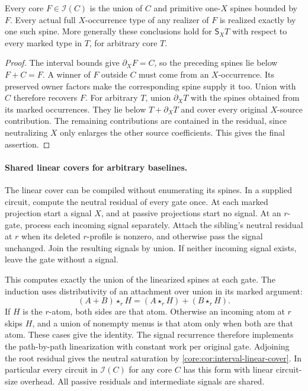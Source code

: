 \begin{corollary}
\label{core:cor:interval-linear-cover}
Every core $F\in\mathcal I(C)$ is the union of $C$ and primitive
one-$X$ spines bounded by $F$. Every actual full $X$-occurrence type
of any realizer of $F$ is realized exactly by one such spine.
More generally these conclusions hold for $\mathsf S_XT$ with respect
to every marked type in $T$, for arbitrary core $T$.
\end{corollary}
\begin{proof}
The interval bounds give $\partial_XF=C$, so the preceding spines
lie below $F+C=F$. A winner of $F$ outside $C$ must come from an
$X$-occurrence. Its preserved owner factors make the corresponding
spine supply it too. Union with $C$ therefore recovers $F$.
For arbitrary $T$, union $\partial_XT$ with the spines obtained from
its marked occurrences. They lie below $T+\partial_XT$ and cover
every original $X$-source contribution. The remaining contributions
are contained in the residual, since neutralizing $X$ only enlarges
the other source coefficients. This gives the final assertion.
\end{proof}

\paragraph{Shared linear covers for arbitrary baselines.}
The linear cover can be compiled without enumerating
its spines. In a supplied circuit, compute the neutral
residual of every gate once. At each marked projection
start a signal $X$, and at passive projections start
no signal. At an $r$-gate, process each incoming
signal separately. Attach the sibling's neutral
residual at $r$ when its deleted $r$-profile is
nonzero, and otherwise pass the signal unchanged.
Join the resulting signals by union. If neither
incoming signal exists, leave the gate without a
signal.

This computes exactly the union of the linearized
spines at each gate. The induction uses distributivity
of an attachment over union in its marked argument:
\[
 (A+B)\star_r H=(A\star_r H)+(B\star_r H).
\]
If $H$ is the $r$-atom, both sides are that atom.
Otherwise an incoming atom at $r$ skips $H$,
and a union of nonempty menus is that atom only
when both are that atom. These cases give the
identity. The signal recurrence therefore implements
the path-by-path linearization with constant work
per original gate. Adjoining the root residual
gives the neutral saturation by
\cref{core:cor:interval-linear-cover}. In particular
every circuit in $\mathcal I(C)$ for any core $C$
has this form with linear circuit-size overhead.
All passive residuals and intermediate signals
are shared.

